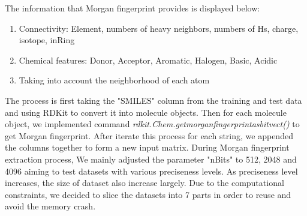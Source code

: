\documentclass[11pt]{article}
\begin{document}
\begin{enumerate}
The information that Morgan fingerprint provides is displayed below:
\begin{enumerate}
\item Connectivity: Element, numbers of heavy neighbors, numbers of Hs, charge, isotope, inRing
\item Chemical features: Donor, Acceptor, Aromatic, Halogen, Basic, Acidic
\item Taking into account the neighborhood of each atom\\
\end{enumerate}
The process is first taking the "SMILES" column from the training and test data and using RDKit to convert it into molecule objects. Then for each molecule object, we implemented command {\itshape rdkit.Chem.getmorganfingerprintasbitvect()} to get Morgan fingerprint. After iterate this process for each string, we appended the columns together to form a new input matrix. During Morgan fingerprint extraction process, We mainly adjusted the parameter "nBits" to 512, 2048 and 4096 aiming to test datasets with various preciseness levels. As preciseness level increases, the size of dataset also increase largely. Due to the computational constraints, we decided to slice the datasets into 7 parts in order to reuse and avoid the memory crash. \\

\end{enumerate}
\end{document}

